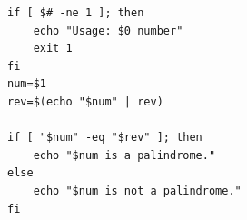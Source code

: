 \begin{verbatim}
if [ $# -ne 1 ]; then
    echo "Usage: $0 number"
    exit 1
fi
num=$1
rev=$(echo "$num" | rev)

if [ "$num" -eq "$rev" ]; then
    echo "$num is a palindrome."
else
    echo "$num is not a palindrome."
fi
\end{verbatim}
